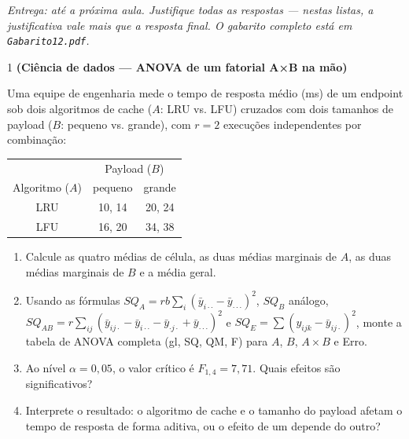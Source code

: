 \documentclass[11pt]{article}
\begin{document}

\noindent \textit{Entrega: até a próxima aula. Justifique todas as respostas --- nestas listas, a
justificativa vale mais que a resposta final. O gabarito completo está em \texttt{Gabarito12.pdf}.}

\begin{questao}{1} \textbf{(Ciência de dados --- ANOVA de um fatorial A×B na mão)}

Uma equipe de engenharia mede o tempo de resposta médio (ms) de um endpoint sob dois algoritmos
de cache ($A$: LRU vs. LFU) cruzados com dois tamanhos de payload ($B$: pequeno vs. grande), com
$r=2$ execuções independentes por combinação:

\begin{center}
\begin{tabular}{c|cc}
 & \multicolumn{2}{c}{Payload ($B$)} \\
Algoritmo ($A$) & pequeno & grande \\ \hline
LRU & 10, 14 & 20, 24 \\
LFU & 16, 20 & 34, 38
\end{tabular}
\end{center}

\begin{enumerate}[label=(\alph*)]
  \item Calcule as quatro médias de célula, as duas médias marginais de $A$, as duas médias
    marginais de $B$ e a média geral.
  \item Usando as fórmulas $SQ_A = rb\sum_i(\bar y_{i\cdot\cdot}-\bar y_{\cdot\cdot\cdot})^2$,
    $SQ_B$ análogo, $SQ_{AB}=r\sum_{ij}(\bar y_{ij\cdot}-\bar y_{i\cdot\cdot}-\bar
    y_{\cdot j\cdot}+\bar y_{\cdot\cdot\cdot})^2$ e $SQ_E=\sum(y_{ijk}-\bar y_{ij\cdot})^2$,
    monte a tabela de ANOVA completa (gl, SQ, QM, F) para $A$, $B$, $A{\times}B$ e Erro.
  \item Ao nível $\alpha=0{,}05$, o valor crítico é $F_{1,4}=7{,}71$. Quais efeitos são
    significativos?
  \item Interprete o resultado: o algoritmo de cache e o tamanho do payload afetam o tempo de
    resposta de forma aditiva, ou o efeito de um depende do outro?
\end{enumerate}
\end{questao}
\end{document}
